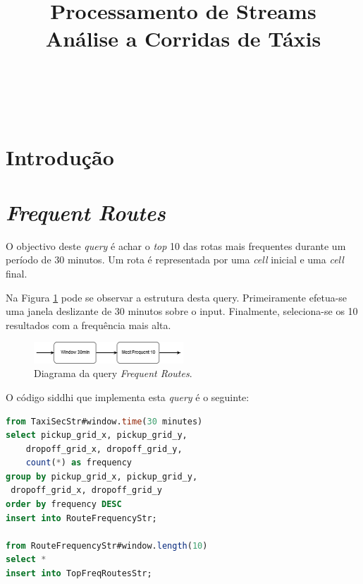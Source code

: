 \documentclass[article]{IEEEtran}
\begin{document}
\title{Processamento de Streams\\Análise a Corridas de Táxis}


\author{\\
\and
{}\\
}

\maketitle



\section{Introdução}

\section{\textit{Frequent Routes}}

O objectivo deste \textit{query} é achar o \textit{top} 10 das rotas mais frequentes durante um período de 30 minutos. Um rota é representada por uma \textit{cell} inicial e uma \textit{cell} final.

Na Figura \ref{fig:frequentRoutesDiagram} pode se observar a estrutura desta query. Primeiramente efetua-se uma janela deslizante de 30 minutos sobre o input. Finalmente, seleciona-se os 10 resultados com a frequência mais alta.

\begin{figure}[hbtp]
    \centering
        \includegraphics[width=0.5\textwidth]{images/frequentRoutesDiagram}
    \caption{Diagrama da query \textit{Frequent Routes}.}
    \label{fig:frequentRoutesDiagram}
\end{figure}

O código siddhi que implementa esta \textit{query} é o seguinte:

\begin{lstlisting}[language=SQL]
from TaxiSecStr#window.time(30 minutes)
select pickup_grid_x, pickup_grid_y, 
	dropoff_grid_x, dropoff_grid_y,
	count(*) as frequency
group by pickup_grid_x, pickup_grid_y,
 dropoff_grid_x, dropoff_grid_y
order by frequency DESC
insert into RouteFrequencyStr;

from RouteFrequencyStr#window.length(10)
select *
insert into TopFreqRoutesStr;
\end{lstlisting}
\end{document}

